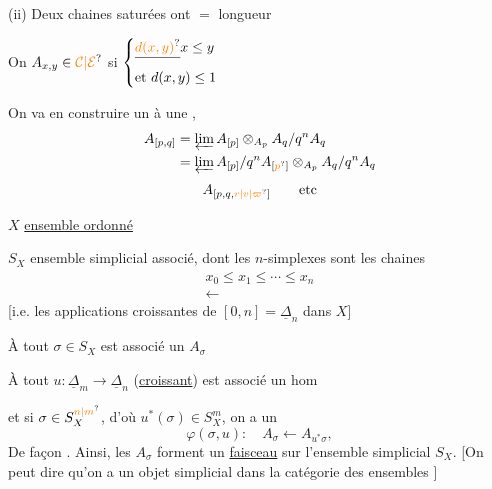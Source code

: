 (ii) Deux chaines saturées ont $=$ longueur

 On  $A_{x,y}\in\unsure{\mathcal C|\mathcal E}$ si $\left\{\begin{aligned}&\deleted{\unsure{d(x,y)}}x\leq y\\&\text{et }d(x,y)\leq1\end{aligned}\right.$

On va en construire un   à une  ,
\[
\begin{aligned}
A_{[p,q]}&=\varprojlim A_{[p]}\otimes_{A_p}A_q/q^n A_q\\
&=\varprojlim A_{[p]}/q^n A_{[\unsure{p}]}\otimes_{A_p}A_q/q^n A_q
\end{aligned}
\]
\[A_{[p,q,\unsure{r|v|\varpi}]}\qquad\text{etc}\]

$X$ \uline{ensemble ordonné}

$S_X$ ensemble simplicial associé, dont les $n$-simplexes sont les chaines
\[
\begin{aligned}
x_0\leq x_1\leq\cdots\leq x_n\\
\longleftarrow
\end{aligned}
\]
[i.e. les applications croissantes de $[0,n]=\underline\Delta_n$ dans $X$]

À tout $\sigma\in S_X$ est associé un $A_\sigma$

À tout    $u:\underline\Delta_m\longrightarrow\underline\Delta_n$ (\uline{croissant}) est associé un hom

et si $\sigma\in S_X^{\unsure{n|m}}$, d'où $u^*(\sigma)\in S_X^m$, on a un 
\[
\varphi(\sigma,u):\quad A_\sigma\longleftarrow A_{u^*\sigma},
\]
De façon .
Ainsi, les $A_\sigma$ forment un \uline{faisceau} sur l'ensemble simplicial $S_X$.  [On peut dire qu'on a un objet simplicial dans la catégorie des ensembles  ]


